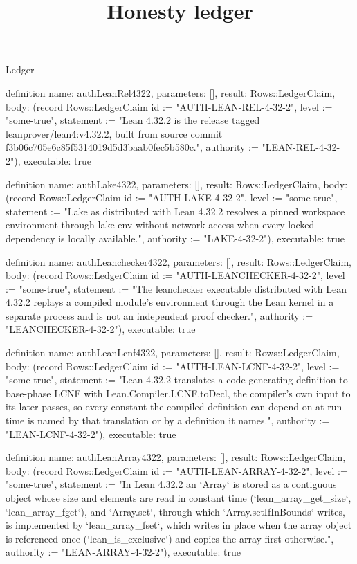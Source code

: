 \begin{lexlean}{Ledger}
\title{Honesty ledger}
\begin{semanticmodule}
definition{
  name: authLeanRel4322,
  parameters: [],
  result: Rows::LedgerClaim,
  body: (record Rows::LedgerClaim {id := "AUTH-LEAN-REL-4-32-2", level := "some-true", statement := "Lean 4.32.2 is the release tagged leanprover/lean4:v4.32.2, built from source commit f3b06c705e6c85f5314019d5d3baab0fec5b580c.", authority := "LEAN-REL-4-32-2"}),
  executable: true
}

definition{
  name: authLake4322,
  parameters: [],
  result: Rows::LedgerClaim,
  body: (record Rows::LedgerClaim {id := "AUTH-LAKE-4-32-2", level := "some-true", statement := "Lake as distributed with Lean 4.32.2 resolves a pinned workspace environment through lake env without network access when every locked dependency is locally available.", authority := "LAKE-4-32-2"}),
  executable: true
}

definition{
  name: authLeanchecker4322,
  parameters: [],
  result: Rows::LedgerClaim,
  body: (record Rows::LedgerClaim {id := "AUTH-LEANCHECKER-4-32-2", level := "some-true", statement := "The leanchecker executable distributed with Lean 4.32.2 replays a compiled module's environment through the Lean kernel in a separate process and is not an independent proof checker.", authority := "LEANCHECKER-4-32-2"}),
  executable: true
}

definition{
  name: authLeanLcnf4322,
  parameters: [],
  result: Rows::LedgerClaim,
  body: (record Rows::LedgerClaim {id := "AUTH-LEAN-LCNF-4-32-2", level := "some-true", statement := "Lean 4.32.2 translates a code-generating definition to base-phase LCNF with Lean.Compiler.LCNF.toDecl, the compiler's own input to its later passes, so every constant the compiled definition can depend on at run time is named by that translation or by a definition it names.", authority := "LEAN-LCNF-4-32-2"}),
  executable: true
}

definition{
  name: authLeanArray4322,
  parameters: [],
  result: Rows::LedgerClaim,
  body: (record Rows::LedgerClaim {id := "AUTH-LEAN-ARRAY-4-32-2", level := "some-true", statement := "In Lean 4.32.2 an `Array` is stored as a contiguous object whose size and elements are read in constant time (`lean_array_get_size`, `lean_array_fget`), and `Array.set`, through which `Array.setIfInBounds` writes, is implemented by `lean_array_fset`, which writes in place when the array object is referenced once (`lean_is_exclusive`) and copies the array first otherwise.", authority := "LEAN-ARRAY-4-32-2"}),
  executable: true
}


\end{semanticmodule}
\end{lexlean}
